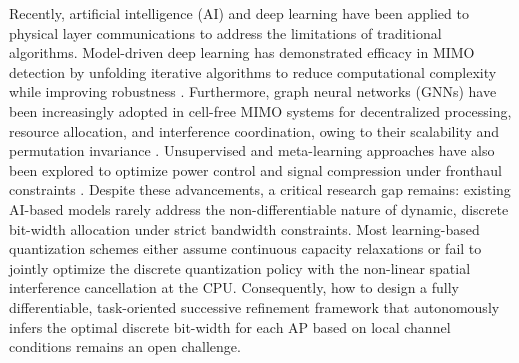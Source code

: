 Recently, artificial intelligence (AI) and deep learning have been applied to physical layer communications to address the limitations of traditional algorithms. Model-driven deep learning has demonstrated efficacy in MIMO detection by unfolding iterative algorithms to reduce computational complexity while improving robustness \cite{he2020model, wei2020learned}. Furthermore, graph neural networks (GNNs) have been increasingly adopted in cell-free MIMO systems for decentralized processing, resource allocation, and interference coordination, owing to their scalability and permutation invariance \cite{pereira2025pixel, wang2025learning, dai2025two}. Unsupervised and meta-learning approaches have also been explored to optimize power control and signal compression under fronthaul constraints \cite{rajapaksha2023unsupervised, xie2026meta}. Despite these advancements, a critical research gap remains: existing AI-based models rarely address the non-differentiable nature of dynamic, discrete bit-width allocation under strict bandwidth constraints. Most learning-based quantization schemes either assume continuous capacity relaxations or fail to jointly optimize the discrete quantization policy with the non-linear spatial interference cancellation at the CPU. Consequently, how to design a fully differentiable, task-oriented successive refinement framework that autonomously infers the optimal discrete bit-width for each AP based on local channel conditions remains an open challenge.


